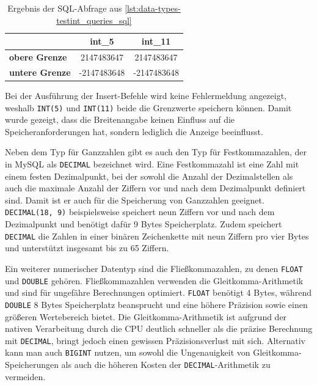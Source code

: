 \vspace{-7pt}

\vspace{-9pt}
\begin{table}[H]
    \centering
    \caption{Ergebnis der SQL-Abfrage aus \ref{lst:data-types-testint_queries_sql}}
    \vspace{-3pt}
    \begin{tabular}{l|c|c}
        & \textbf{int\_5} & \textbf{int\_11} \\ \hline
        \textbf{obere Grenze} & 2147483647 & 2147483647 \\ \hline
        \textbf{untere Grenze} & -2147483648 & -2147483648
    \end{tabular}
    \label{tab:int_values}
\end{table}
\vspace{-9pt}

Bei der Ausführung der Insert-Befehle wird keine Fehlermeldung angezeigt, weshalb \texttt{INT(5)} und \texttt{INT(11)} beide die Grenzwerte speichern können.
Damit wurde gezeigt, dass die Breitenangabe keinen Einfluss auf die Speicheranforderungen hat, sondern lediglich die Anzeige beeinflusst.

Neben dem Typ für Ganzzahlen gibt es auch den Typ für Festkommazahlen, der in MySQL als \texttt{DECIMAL} bezeichnet wird.
Eine Festkommazahl ist eine Zahl mit einem festen Dezimalpunkt, bei der sowohl die Anzahl der Dezimalstellen als auch die maximale Anzahl der Ziffern vor und nach dem Dezimalpunkt definiert sind.
Damit ist er auch für die Speicherung von Ganzzahlen geeignet.
\texttt{DECIMAL(18, 9)} beispielsweise speichert neun Ziffern vor und nach dem Dezimalpunkt und benötigt dafür 9 Bytes Speicherplatz.
Zudem speichert \texttt{DECIMAL} die Zahlen in einer binären Zeichenkette mit neun Ziffern pro vier Bytes und unterstützt insgesamt bis zu 65 Ziffern.

Ein weiterer numerischer Datentyp sind die Fließkommazahlen, zu denen \texttt{FLOAT} und \texttt{DOUBLE} gehören.
Fließkommazahlen verwenden die Gleitkomma-Arithmetik und sind für ungefähre Berechnungen optimiert.
\texttt{FLOAT} benötigt 4 Bytes, während \texttt{DOUBLE} 8 Bytes Speicherplatz beansprucht und eine höhere Präzision sowie einen größeren Wertebereich bietet.
Die Gleitkomma-Arithmetik ist aufgrund der nativen Verarbeitung durch die CPU deutlich schneller als die präzise Berechnung mit \texttt{DECIMAL}, bringt jedoch einen gewissen Präzisionsverlust mit sich.
Alternativ kann man auch \texttt{BIGINT} nutzen, um sowohl die Ungenauigkeit von Gleitkomma-Speicherungen als auch die höheren Kosten der \texttt{DECIMAL}-Arithmetik zu vermeiden.

